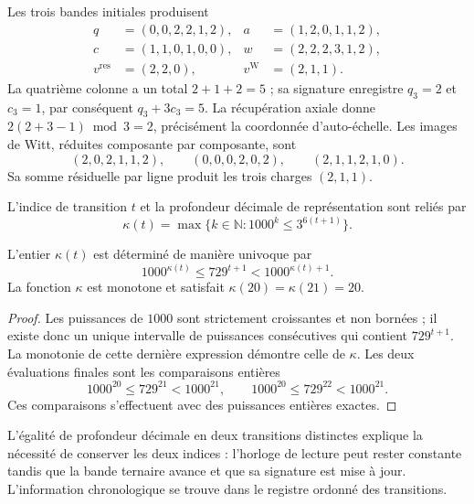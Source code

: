 \begin{example}
Les trois bandes initiales produisent
\begin{align*}
 q&=(0,0,2,2,1,2),&a&=(1,2,0,1,1,2),\\
 c&=(1,1,0,1,0,0),&w&=(2,2,2,3,1,2),\\
 v^{\mathrm{res}}&=(2,2,0),&v^{\mathrm W}&=(2,1,1).
\end{align*}
La quatrième colonne a un total \(2+1+2=5\) ; sa signature enregistre \(q_3=2\) et \(c_3=1\), par conséquent \(q_3+3c_3=5\).
La récupération axiale donne \(2(2+3-1)\bmod3=2\), précisément la coordonnée d'auto-échelle.
Les images de Witt, réduites composante par composante, sont
\[
 (2,0,2,1,1,2),\qquad
 (0,0,0,2,0,2),\qquad
 (2,1,1,2,1,0).
\]
Sa somme résiduelle par ligne produit les trois charges \((2,1,1)\).
\end{example}

\begin{definition}
L'indice de transition \(t\) et la profondeur décimale de représentation sont
reliés par
\begin{equation}
 \kappa(t)=\max\{k\in\mathbb N:1000^k\leq3^{6(t+1)}\}.
 \label{act21:eq:df-reloj}
\end{equation}
\end{definition}

\begin{proposition}
\label{act21:prop:df-reloj}
L'entier \(\kappa(t)\) est déterminé de manière univoque par
\begin{equation}
 1000^{\kappa(t)}\leq729^{t+1}<1000^{\kappa(t)+1}.
 \label{act21:eq:df-reloj-cotas}
\end{equation}
La fonction \(\kappa\) est monotone et satisfait
\(\kappa(20)=\kappa(21)=20\).
\end{proposition}

\begin{proof}
Les puissances de \(1000\) sont strictement croissantes et non bornées ;
il existe donc un unique intervalle de puissances consécutives qui
contient \(729^{t+1}\). La monotonie de cette dernière expression démontre
celle de \(\kappa\). Les deux évaluations finales sont les comparaisons
entières
\[
 1000^{20}\leq729^{21}<1000^{21},\qquad
 1000^{20}\leq729^{22}<1000^{21}.
\]
Ces comparaisons s'effectuent avec des puissances entières exactes.
\end{proof}

L'égalité de profondeur décimale en deux transitions distinctes explique la nécessité de conserver les deux indices : l'horloge de lecture peut rester constante tandis que la bande ternaire avance et que sa signature est mise à jour. L'information chronologique se trouve dans le registre ordonné des transitions.

